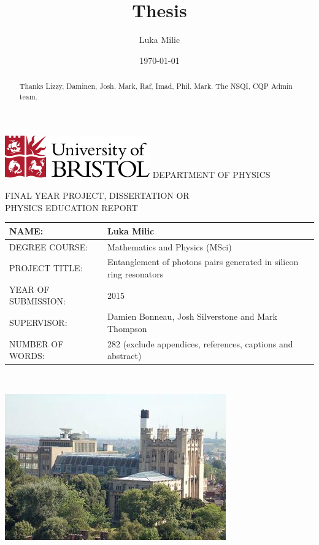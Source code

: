 \documentclass[11pt]{article}
\title{Thesis}
\date{\today}
\author{Luka Milic}
\begin{document}
\begin{titlepage}
\sffamily
  \includegraphics[scale=0.7]{img/uob-logo.png}\hfill
  \LARGE DEPARTMENT OF PHYSICS \\
  \begin{center}
    FINAL YEAR PROJECT, DISSERTATION OR\\
    PHYSICS EDUCATION REPORT
  \end{center} 

  \large
  \begin{tabular}[t]{|l|p{9cm}|}
    \hline
    NAME: & Luka Milic \\ \hline
    DEGREE COURSE: & Mathematics and Physics (MSci)\\ \hline
    PROJECT TITLE: & Entanglement of photons pairs generated in silicon ring resonators \\ \hline
    YEAR OF SUBMISSION: & 2015\\ \hline
    SUPERVISOR: & Damien Bonneau, Josh Silverstone and Mark Thompson\\ \hline
    NUMBER OF WORDS: & 282 (exclude appendices, references, captions and abstract)\\ \hline
  \end{tabular}
  \\[1.5cm]
  \begin{center}
    \includegraphics[scale=1]{img/physics-building.jpg}
  \end{center}
\end{titlepage}
\renewcommand{\abstractname}{Acknowledgements}
\newpage
\begin{abstract}
 Thanks Lizzy, Daminen, Josh, Mark, Raf, Imad, Phil, Mark. The NSQI, CQP Admin team.
\end{abstract}
\newpage
\tableofcontents
\newpage






%


\newpage
\appendix 


\end{document}
